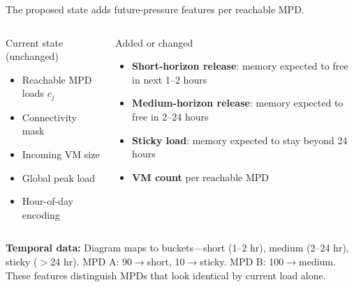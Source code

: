 \documentclass[11pt,aspectratio=43]{beamer}
\begin{document}
\begin{frame}{The proposed state adds future-pressure features per reachable MPD.}
  \begin{columns}[T,onlytextwidth]
      \begin{block}{Current state (unchanged)}
        \begin{itemize}
          \item Reachable MPD loads $c_j$
          \item Connectivity mask
          \item Incoming VM size
          \item Global peak load
          \item Hour-of-day encoding
        \end{itemize}
      \end{block}
      \begin{block}{Added or changed}
        \begin{itemize}
          \item \textbf{Short-horizon release}: memory expected to free in next 1--2 hours
          \item \textbf{Medium-horizon release}: memory expected to free in 2--24 hours
          \item \textbf{Sticky load}: memory expected to stay beyond 24 hours
          \item \textbf{VM count} per reachable MPD
        \end{itemize}
      \end{block}
  \end{columns}
  \vspace{0.2em}
  \small
  \textbf{Temporal data:} Diagram maps to buckets---short (1--2 hr), medium (2--24 hr), sticky ($>$24 hr). MPD A: 90$\rightarrow$short, 10$\rightarrow$sticky. MPD B: 100$\rightarrow$medium. These features distinguish MPDs that look identical by current load alone.
\end{frame}
\end{document}

